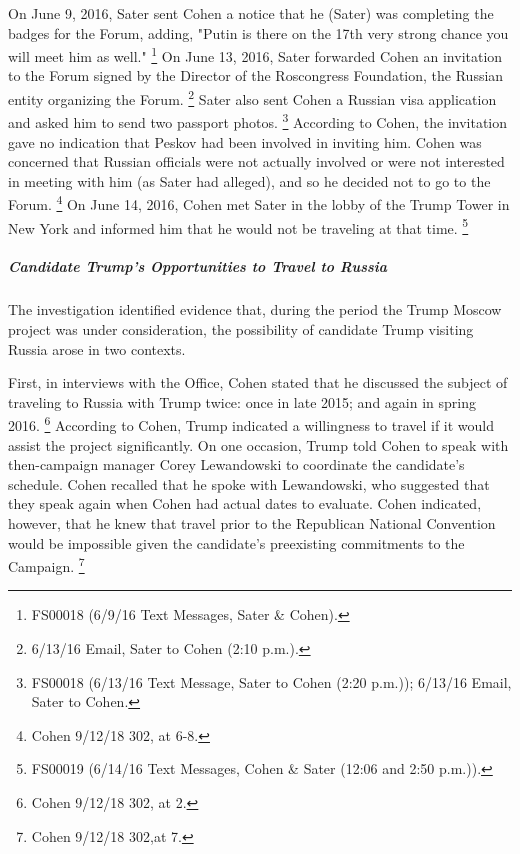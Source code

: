 On June 9, 2016, Sater sent Cohen a notice that he (Sater) was completing the badges for the Forum, adding, "Putin is there on the 17th very strong chance you will meet him as well."%
\footnote{FS00018 (6/9/16 Text Messages, Sater \& Cohen).}
On June 13, 2016, Sater forwarded Cohen an invitation to the Forum signed by the Director of the Roscongress Foundation, the Russian entity organizing the Forum.%
\footnote{6/13/16 Email, Sater to Cohen (2:10 p.m.).}
Sater also sent Cohen a Russian visa application and asked him to send two passport photos.%
\footnote{FS00018 (6/13/16 Text Message, Sater to Cohen (2:20 p.m.));
6/13/16 Email, Sater to Cohen.}
According to Cohen, the invitation gave no indication that Peskov had been involved in inviting him.
Cohen was concerned that Russian officials were not actually involved or were not interested in meeting with him (as Sater had alleged), and so he decided not to go to the Forum.%
\footnote{Cohen 9/12/18 302, at 6-8.}
On June 14, 2016, Cohen met Sater in the lobby of the Trump Tower in New York and informed him that he would not be traveling at that time.%
\footnote{FS00019 (6/14/16 Text Messages, Cohen \& Sater (12:06 and 2:50 p.m.)).}

\subparagraph{Candidate Trump's Opportunities to Travel to Russia}

The investigation identified evidence that, during the period the Trump Moscow project was under consideration, the possibility of candidate Trump visiting Russia arose in two contexts.

First, in interviews with the Office, Cohen stated that he discussed the subject of traveling to Russia with Trump twice: once in late 2015; and again in spring 2016.%
\footnote{Cohen 9/12/18 302, at 2.}
According to Cohen, Trump indicated a willingness to travel if it would assist the project significantly.
On one occasion, Trump told Cohen to speak with then-campaign manager Corey Lewandowski to coordinate the candidate's schedule.
Cohen recalled that he spoke with Lewandowski, who suggested that they speak again when Cohen had actual dates to evaluate.
Cohen indicated, however, that he knew that travel prior to the Republican National Convention would be impossible given the candidate's preexisting commitments to the Campaign.%
\footnote{Cohen 9/12/18 302,at 7.}

